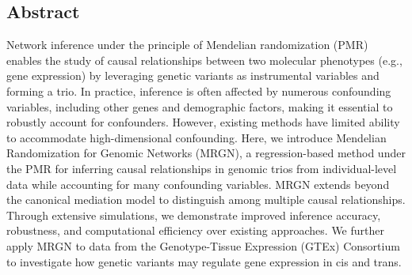 \documentclass[12pt,letterpaper]{report}
\begin{document}
\begin{doublespace}

\section*{Abstract}

Network inference under the principle of Mendelian randomization (PMR) enables the study of causal relationships between two molecular phenotypes (e.g., gene expression) by leveraging genetic variants as instrumental variables and forming a trio. In practice, inference is often affected by numerous confounding variables, including other genes and demographic factors, making it essential to robustly account for confounders. However, existing methods have limited ability to accommodate high-dimensional confounding.
Here, we introduce Mendelian Randomization for Genomic Networks (MRGN), a regression-based method under the PMR for inferring causal relationships in genomic trios from individual-level data while accounting for many confounding variables. MRGN extends beyond the canonical mediation model to distinguish among multiple causal relationships. Through extensive simulations, we demonstrate improved inference accuracy, robustness, and computational efficiency over existing approaches. We further apply MRGN to data from the Genotype-Tissue Expression (GTEx) Consortium to investigate how genetic variants may regulate gene expression in cis and trans.


\end{doublespace}
\end{document}
